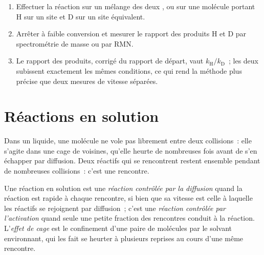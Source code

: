 \begin{method}\label{met:b3:rate-theories:kie}
\begin{enumerate}
  \item Effectuer la réaction sur un mélange des deux , ou sur
        une molécule portant H sur un site et D sur un site équivalent.
  \item Arrêter à faible conversion et mesurer le rapport des produits H et
        D par spectrométrie de masse ou par RMN.
  \item Le rapport des produits, corrigé du rapport de départ, vaut
        $k_{\mathrm H}/k_{\mathrm D}$~; les deux  subissent
        exactement les mêmes conditions, ce qui rend la méthode plus
        précise que deux mesures de vitesse séparées.
\end{enumerate}
\end{method}

\section{Réactions en solution}

Dans un liquide, une molécule ne vole pas librement entre deux
collisions~: elle s'agite dans une cage de voisines, qu'elle heurte de
nombreuses fois avant de s'en échapper par diffusion. Deux réactifs qui
se rencontrent restent ensemble pendant de nombreuses collisions~: c'est
une rencontre.

\begin{definition}\label{def:b3:rate-theories:diffusion}
Une réaction en solution est une \emph{réaction contrôlée par la
diffusion}
quand la réaction est rapide à chaque rencontre, si bien que sa vitesse
est celle à laquelle les réactifs se rejoignent par diffusion~; c'est une
\emph{réaction contrôlée par l'activation}
quand seule une petite fraction des rencontres conduit à la réaction.
L'\emph{effet de cage} est le confinement d'une
paire de molécules par le solvant environnant, qui les fait se heurter à
plusieurs reprises au cours d'une même rencontre.
\end{definition}

